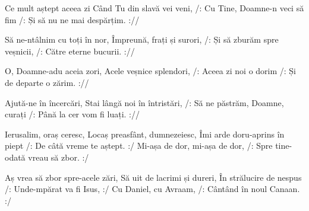 \beginverse
Ce mult aștept aceea zi
Când Tu din slavă vei veni,
/: Cu Tine, Doamne-n veci să fim
/: Și să nu ne mai despărțim. ://
\endverse

\beginverse
Să ne-ntâlnim cu toți în nor,
Împreună, frați și surori,
/: Și să zburăm spre veșnicii,
/: Către eterne bucurii. ://
\endverse

\beginverse
O, Doamne-adu aceia zori,
Acele veșnice splendori,
/: Aceea zi noi o dorim
/: Și de departe o zărim. ://
\endverse

\beginverse
Ajută-ne în încercări,
Stai lângă noi în întristări,
/: Să ne păstrăm, Doamne, curați
/: Până la cer vom fi luați. ://
\endverse

\beginverse
Ierusalim, oraș ceresc,
Locaș preasfânt, dumnezeiesc,
Îmi arde doru-aprins în piept
/: De câtă vreme te aștept. :/
Mi-așa de dor, mi-așa de dor,
/: Spre tine-odată vreau să zbor. :/
\endverse

\beginverse
Aș vrea să zbor spre-acele zări,
Să uit de lacrimi și dureri,
În strălucire de nespus
/: Unde-mpărat va fi Isus, :/
Cu Daniel, cu Avraam,
/: Cântând în noul Canaan. :/
\endverse
\endsong